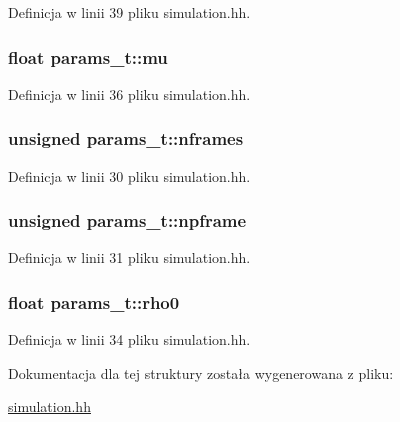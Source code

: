 Definicja w linii 39 pliku simulation.\-hh.

\hypertarget{structparams__t_a971359c29b2f946b477e4a1b3605fa3f}{
\subsubsection[{mu}]{\setlength{\rightskip}{0pt plus 5cm}float params\-\_\-t\-::mu}}\label{structparams__t_a971359c29b2f946b477e4a1b3605fa3f}


Definicja w linii 36 pliku simulation.\-hh.

\hypertarget{structparams__t_a2cecc28f4ca024657cf567047e2aba59}{
\subsubsection[{nframes}]{\setlength{\rightskip}{0pt plus 5cm}unsigned params\-\_\-t\-::nframes}}\label{structparams__t_a2cecc28f4ca024657cf567047e2aba59}


Definicja w linii 30 pliku simulation.\-hh.

\hypertarget{structparams__t_a06a1a567fd5ba13905514227e2bb710a}{
\subsubsection[{npframe}]{\setlength{\rightskip}{0pt plus 5cm}unsigned params\-\_\-t\-::npframe}}\label{structparams__t_a06a1a567fd5ba13905514227e2bb710a}


Definicja w linii 31 pliku simulation.\-hh.

\hypertarget{structparams__t_a2eb309edb681d0a998f23fc692a73781}{
\subsubsection[{rho0}]{\setlength{\rightskip}{0pt plus 5cm}float params\-\_\-t\-::rho0}}\label{structparams__t_a2eb309edb681d0a998f23fc692a73781}


Definicja w linii 34 pliku simulation.\-hh.



Dokumentacja dla tej struktury została wygenerowana z pliku\-:\begin{DoxyCompactItemize}
\item 
\hyperlink{simulation_8hh}{simulation.\-hh}\end{DoxyCompactItemize}
